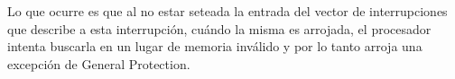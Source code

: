 Lo que ocurre es que al no estar seteada la entrada del vector de interrupciones que describe a esta interrupción, cuándo la misma es arrojada, el procesador intenta buscarla en un lugar de memoria inválido y por lo tanto arroja una excepción de General Protection.
